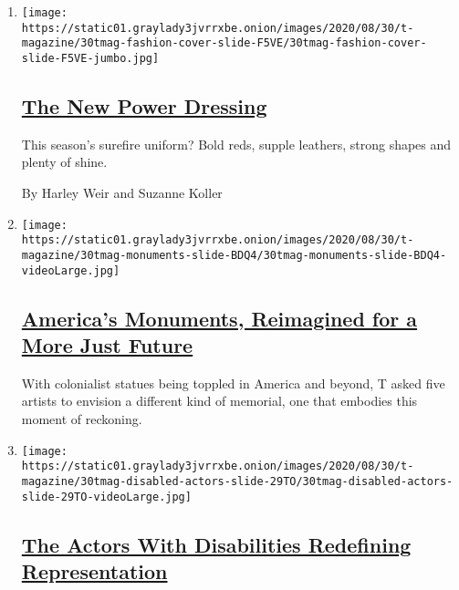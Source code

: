 \begin{enumerate}
\def\labelenumi{\arabic{enumi}.}
\item
  \texttt{[image: https://static01.graylady3jvrrxbe.onion/images/2020/08/30/t-magazine/30tmag-fashion-cover-slide-F5VE/30tmag-fashion-cover-slide-F5VE-jumbo.jpg]}

  \hypertarget{the-new-power-dressing}{%
  \subsection{\texorpdfstring{\href{/2020/08/26/t-magazine/fall-womens-fashion-cover.html}{The
  New Power
  Dressing}}{The New Power Dressing}}\label{the-new-power-dressing}}

  This season's surefire uniform? Bold reds, supple leathers, strong
  shapes and plenty of shine.

  By Harley Weir and Suzanne Koller
\item
  \texttt{[image: https://static01.graylady3jvrrxbe.onion/images/2020/08/30/t-magazine/30tmag-monuments-slide-BDQ4/30tmag-monuments-slide-BDQ4-videoLarge.jpg]}

  \hypertarget{americas-monuments-reimagined-for-a-more-just-future}{%
  \subsection{\texorpdfstring{\href{/2020/08/24/t-magazine/confederate-monuments-reimagined-racism.html}{America's
  Monuments, Reimagined for a More Just
  Future}}{America's Monuments, Reimagined for a More Just Future}}\label{americas-monuments-reimagined-for-a-more-just-future}}

  With colonialist statues being toppled in America and beyond, T asked
  five artists to envision a different kind of memorial, one that
  embodies this moment of reckoning.
\item
  \texttt{[image: https://static01.graylady3jvrrxbe.onion/images/2020/08/30/t-magazine/30tmag-disabled-actors-slide-29TO/30tmag-disabled-actors-slide-29TO-videoLarge.jpg]}

  \hypertarget{the-actors-with-disabilities-redefining-representation}{%
  \subsection{\texorpdfstring{\href{/2020/08/25/t-magazine/actors-disability-theater-film-tv.html}{The
  Actors With Disabilities Redefining
  Representation}}{The Actors With Disabilities Redefining Representation}}\label{the-actors-with-disabilities-redefining-representation}}


\end{enumerate}
